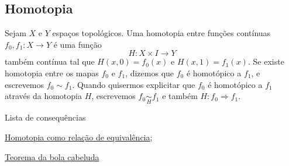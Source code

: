 \subsection{Homotopia}
\label{homotopia-def}
\begin{defi}[Homotopia]
	Sejam $X$ e $Y$ espaços topológicos. Uma homotopia entre funções contínuas $f_0, f_1: X\rightarrow Y$ é uma função $$H:X\times I\rightarrow Y$$ também contínua tal que $H(x,0)=f_0(x)$ e $H(x,1)=f_1(x)$. Se existe homotopia entre os mapas $f_0$ e $f_1$, dizemos que $f_0$ é homotópico a $f_1$, e escrevemos $f_0\sim f_1$. Quando quisermos explicitar que $f_0$ é homotópico a $f_1$ através da homotopia $H$, escrevemos $f_0 \underset{H}{\sim} f_1$ e também $H:f_0\Rightarrow f_1$.
\end{defi}

\begin{titlemize}{Lista de consequências}
	\item \hyperref[homotopia-relaçao-de-equivalencia-prop]{Homotopia como relação de equivalência};\\ %
	\item \hyperref[teorema-bola-cabeluda-prop]{Teorema da bola cabeluda}
\end{titlemize}

